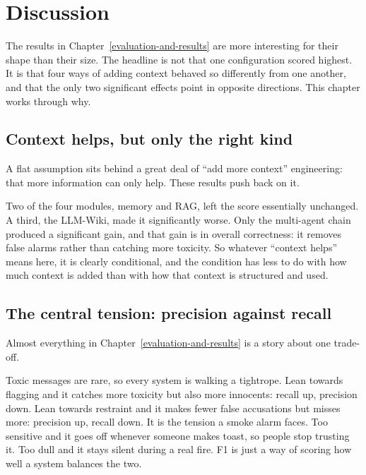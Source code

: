 \chapter{Discussion}\label{discussion}

The results in Chapter~\ref{evaluation-and-results} are more interesting for their shape than their size. The headline is not that one configuration scored highest. It is that four ways of adding context behaved so differently from one another, and that the only two significant effects point in opposite directions. This chapter works through why.

\section{Context helps, but only the right kind}\label{context-helps-but-only-the-right-kind}

A flat assumption sits behind a great deal of ``add more context'' engineering: that more information can only help. These results push back on it.

Two of the four modules, memory and RAG, left the score essentially unchanged. A third, the LLM-Wiki, made it significantly worse. Only the multi-agent chain produced a significant gain, and that gain is in overall correctness: it removes false alarms rather than catching more toxicity. So whatever ``context helps'' means here, it is clearly conditional, and the condition has less to do with how much context is added than with how that context is structured and used.

\section{The central tension: precision against recall}\label{the-central-tension-precision-against-recall}

Almost everything in Chapter~\ref{evaluation-and-results} is a story about one trade-off.

Toxic messages are rare, so every system is walking a tightrope. Lean towards flagging and it catches more toxicity but also more innocents: recall up, precision down. Lean towards restraint and it makes fewer false accusations but misses more: precision up, recall down. It is the tension a smoke alarm faces. Too sensitive and it goes off whenever someone makes toast, so people stop trusting it. Too dull and it stays silent during a real fire. F1 is just a way of scoring how well a system balances the two.

